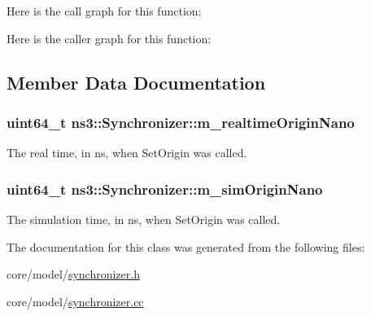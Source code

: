 Here is the call graph for this function\+:




Here is the caller graph for this function\+:




\subsection{Member Data Documentation}
\subsubsection[{\texorpdfstring{m\+\_\+realtime\+Origin\+Nano}{m_realtimeOriginNano}}]{\setlength{\rightskip}{0pt plus 5cm}uint64\+\_\+t ns3\+::\+Synchronizer\+::m\+\_\+realtime\+Origin\+Nano\hspace{0.3cm}{\ttfamily [protected]}}\hypertarget{classns3_1_1Synchronizer_a8156cd6893af54e80108f5630c63c2ab}{}\label{classns3_1_1Synchronizer_a8156cd6893af54e80108f5630c63c2ab}
The real time, in ns, when Set\+Origin was called. 
\subsubsection[{\texorpdfstring{m\+\_\+sim\+Origin\+Nano}{m_simOriginNano}}]{\setlength{\rightskip}{0pt plus 5cm}uint64\+\_\+t ns3\+::\+Synchronizer\+::m\+\_\+sim\+Origin\+Nano\hspace{0.3cm}{\ttfamily [protected]}}\hypertarget{classns3_1_1Synchronizer_ad942aa4d448de68f9c3ca022ba6408b5}{}\label{classns3_1_1Synchronizer_ad942aa4d448de68f9c3ca022ba6408b5}
The simulation time, in ns, when Set\+Origin was called. 

The documentation for this class was generated from the following files\+:\begin{DoxyCompactItemize}
\item 
core/model/\hyperlink{synchronizer_8h}{synchronizer.\+h}\item 
core/model/\hyperlink{synchronizer_8cc}{synchronizer.\+cc}\end{DoxyCompactItemize}

